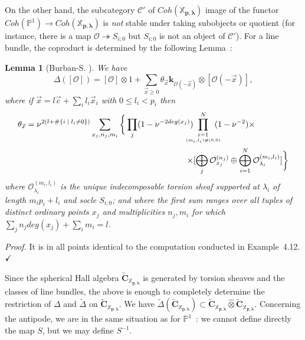 \documentclass[a4paper,10pt]{amsart}
\def\qed{$\hfill \checkmark$}
\def\O{\mathcal{O}}
\def\xpl{\mathbb{X}_{\mathbf{p},\boldsymbol{\lambda}}}
\newtheorem{lem}[theo]{Lemma}
\numberwithin{equation}{section}
\begin{document}
{On the other hand, the subcategory $\mathcal{C}'$ of $Coh(\xpl)$ image of the functor $Coh(\mathbb{P}^1) \to Coh(\xpl)$ is \textit{not} stable under taking subobjects or quotient (for instance, there is a map $\O \twoheadrightarrow S_{i;0}$ but $S_{i;0}$ is not an object of $\mathcal{C}'$). For a line bundle, the coproduct is determined by the following Lemma~:

\vspace{.1in}

\begin{lem}[Burban-S. \cite{BS2}] We have
$$\Delta([\O])=[\O] \otimes 1 + \sum_{\vec{x} \geq 0} \theta_{\vec{x}} \mathbf{k}_{\O(-\vec{x})}\otimes [\O(-\vec{x})],$$
where if $\vec{x}=l\vec{c} + \sum_i l_i \vec{x}_i$ with $0 \leq l_i <p_i$ then
\begin{equation*}
\begin{split}
\theta_{\vec{x}}=\nu^{2(l+\#\{i\;|\; l_i \neq 0\})}\sum_{x_j,n_j,m_i}\bigg\{ \prod_{j} (1-\nu^{-2deg(x_j)})&\hspace{-.15in}\prod_{\underset{(m_i,l_i) \neq (0,0)}{i=1}}^N \hspace{-.1in}(1-\nu^{-2}) \times \\
\times &[\bigoplus_j\O_{x_j}^{(n_j)} \oplus \bigoplus_{i=1}^N \O_{\lambda_i}^{(m_i,l_i)}]\bigg\}
\end{split}
\end{equation*}
where $\O_{\lambda_i}^{(m_i,l_i)}$ is the unique indecomposable  torsion sheaf supported at $\lambda_i$ of length $m_ip_i+l_i$ and socle $S_{i;0}$; and where the first sum ranges over all tuples of distinct ordinary points $x_j$ and multiplicities $n_j, m_i$ for which $\sum_j n_jdeg(x_j)+\sum_i m_i=l$.
\end{lem}
\noindent
\textit{Proof.} It is in all points identical to the computation conducted in Example~4.12.\qed


Since the spherical Hall algebra $\widetilde{\mathbf{C}}_{\xpl}$ is generated by torsion sheaves and the classes of line bundles, the above is enough to completely determine the restriction of $\Delta$ and $\widetilde{\Delta}$ on $\widetilde{\mathbf{C}}_{\xpl}$. We have $\widetilde{\Delta}(\widetilde{\mathbf{C}}_{\xpl})\subset \widetilde{\mathbf{C}}_{\xpl} \widehat{\otimes} \widetilde{\mathbf{C}}_{\xpl}$. Concerning the antipode, we are in the same situation as for $\mathbb{P}^1$~: we cannot define directly the map $S$, but we may define $S^{-1}$.

}
\end{document}
